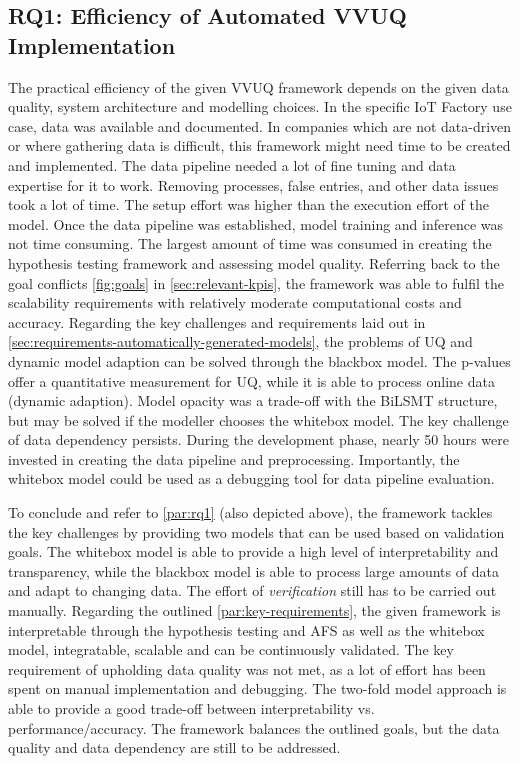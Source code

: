 \subsection{RQ1: Efficiency of Automated VVUQ Implementation}
\label{sec:discussion_rq1}
The practical efficiency of the given VVUQ framework depends on the given data quality, system architecture and modelling choices. In the specific IoT Factory use case, data was available and documented. In companies which are not data-driven or where gathering data is difficult, this framework might need time to be created and implemented. The data pipeline needed a lot of fine tuning and data expertise for it to work. Removing processes, false entries, and other data issues took a lot of time. The setup effort was higher than the execution effort of the model. Once the data pipeline was established, model training and inference was not time consuming. The largest amount of time was consumed in creating the hypothesis testing framework and assessing model quality. Referring back to the goal conflicts \autoref{fig:goals} in \autoref{sec:relevant-kpis}, the framework was able to fulfil the scalability requirements with relatively moderate computational costs and accuracy. Regarding the key challenges and requirements laid out in \autoref{sec:requirements-automatically-generated-models}, the problems of UQ and dynamic model adaption can be solved through the blackbox model. The p-values offer a quantitative measurement for UQ, while it is able to process online data (dynamic adaption). Model opacity was a trade-off with the BiLSMT structure, but may be solved if the modeller chooses the whitebox model. The key challenge of data dependency persists. During the development phase, nearly 50 hours were invested in creating the data pipeline and preprocessing. Importantly, the whitebox model could be used as a debugging tool for data pipeline evaluation.

To conclude and refer to \autoref{par:rq1} (also depicted above), the framework tackles the key challenges by providing two models that can be used based on validation goals. The whitebox model is able to provide a high level of interpretability and transparency, while the blackbox model is able to process large amounts of data and adapt to changing data. The effort of \textit{verification} still has to be carried out manually. Regarding the outlined \autoref{par:key-requirements}, the given framework is interpretable through the hypothesis testing and AFS as well as the whitebox model, integratable, scalable and can be continuously validated. The key requirement of upholding data quality was not met, as a lot of effort has been spent on manual implementation and debugging. The two-fold model approach is able to provide a good trade-off between interpretability vs. performance/accuracy. The framework balances the outlined goals, but the data quality and data dependency are still to be addressed.

